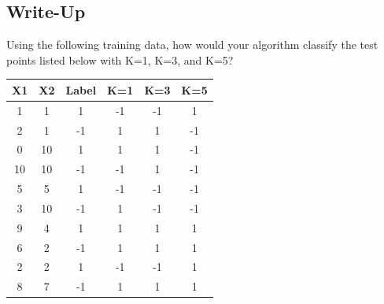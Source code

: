 \documentclass[11pt]{article}
\theoremstyle{definition}
\begin{document}
\subsection{Write-Up}
\begin{shaded}
Using the following training data, how would your algorithm classify the test points listed below
with \textsf{K=1}, \textsf{K=3}, and \textsf{K=5}?
\begin{center}
    \begin{tabular}{|c|c|c|c|c|c|}
    \hline
    \rowcolor{gray!15}X1 & X2 & Label & K=1 & K=3 & K=5\\
    \hline
    \rowcolor{white}1   &   1   &   1   &   -1  &   -1  &   1\\
    \rowcolor{white}2   &   1   &   -1  &   1   &   1   &   -1\\
    \rowcolor{white}0   &   10  &   1   &   1   &   1   &   -1\\
    \rowcolor{white}10  &   10  &   -1  &   -1  &   1   &   -1\\
    \rowcolor{white}5   &   5   &   1   &   -1  &   -1  &   -1\\
    \rowcolor{white}3   &   10  &   -1  &   1   &   -1  &   -1\\
    \rowcolor{white}9   &   4   &   1   &   1   &   1   &   1\\
    \rowcolor{white}6   &   2   &   -1  &   1   &   1   &   1\\
    \rowcolor{white}2   &   2   &   1   &   -1  &   -1  &   1\\
    \rowcolor{white}8   &   7   &   -1  &   1   &   1   &   1\\
    \hline
    \end{tabular}  
\end{center}
\end{shaded}
\end{document}
